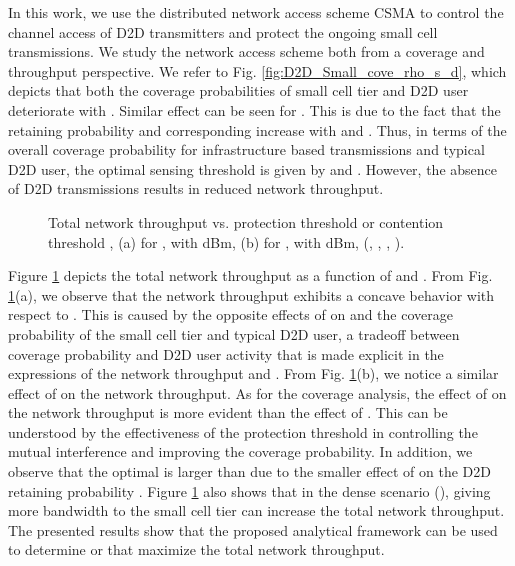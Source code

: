 \documentclass[twocolumn,english]{IEEEtran}
\theoremstyle{plain}
\theoremstyle{definition}
\begin{document}
In this work, we use the distributed network access scheme CSMA to
control the channel access of D2D transmitters and protect the ongoing
small cell transmissions. We study the network access scheme both
from a coverage and throughput perspective. We refer to Fig. \ref{fig:D2D_Small_cove_rho_s_d},
which depicts that both the coverage probabilities of small cell tier
and D2D user deteriorate with . Similar effect
can be seen for . This is due to the fact that
the retaining probability and corresponding 
increase with  and . Thus,
in terms of the overall coverage probability for infrastructure based
transmissions and typical D2D user, the optimal sensing threshold
is given by  and .
However, the absence of D2D transmissions results in reduced network
throughput.

\begin{figure}[t]

\protect\caption{\label{fig:Thrpt_sense}Total network throughput vs. protection threshold
 or contention threshold ,
(a) for , with  dBm, (b)
for , with  dBm, (,
, ,
). }
\end{figure}


Figure \ref{fig:Thrpt_sense} depicts the total network throughput
as a function of  and . From
Fig. \ref{fig:Thrpt_sense}(a), we observe that the network throughput
exhibits a concave behavior with respect to .
This is caused by the opposite effects of  on
 and the coverage probability of the small
cell tier and typical D2D user, a tradeoff between coverage probability
and D2D user activity that is made explicit in the expressions of
the network throughput  and .
From Fig. \ref{fig:Thrpt_sense}(b), we notice a similar effect of
 on the network throughput. As for the coverage
analysis, the effect of  on the network throughput
is more evident than the effect of . This can
be understood by the effectiveness of the protection threshold 
in controlling the mutual interference and improving the coverage
probability. In addition, we observe that the optimal 
is larger than  due to the smaller effect
of  on the D2D retaining probability .
Figure \ref{fig:Thrpt_sense} also shows that in the dense scenario
(), giving more bandwidth
to the small cell tier can increase the total network throughput.
The presented results show that the proposed analytical framework
can be used to determine  or 
that maximize the total network throughput.
\end{document}
